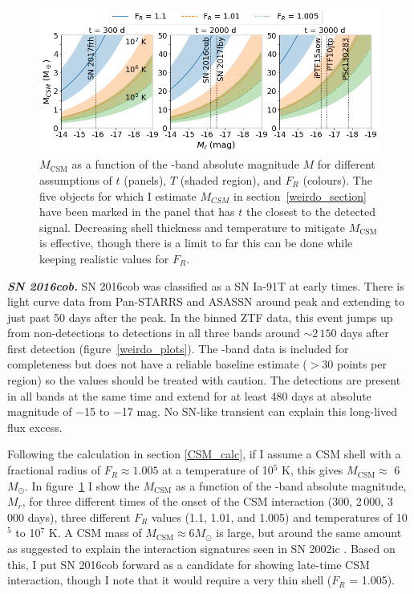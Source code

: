 \documentclass[a4paper,oneside,12pt, class=Latex/Classes/PhDthesisPSnPDF, crop=false]{standalone}
\begin{document}
\begin{figure}
    \centering
    \includegraphics[width=16cm]{../Images/chapter_4/M_MCSM_rel.png}
    \caption[$M_\text{CSM}$ curves for different conditions.]{$M_\text{CSM}$ as a function of the \ztfr-band absolute magnitude $M$ for different assumptions of $t$ (panels), $T$ (shaded region), and $F_R$ (colours). The five objects for which I estimate $M_{CSM}$ in section~\ref{weirdo_section} have been marked in the panel that has $t$ the closest to the detected signal. Decreasing shell thickness and temperature to mitigate $M_\text{CSM}$ is effective, though there is a limit to far this can be done while keeping realistic values for $F_R$.}
    \label{M_CMS_fig}
\end{figure}


\textit{\textbf{SN 2016cob.}}
SN 2016cob was classified as a SN Ia-91T at early times. There is light curve data from Pan-STARRS and ASASSN around peak and extending to just past 50 days after the peak. In the binned ZTF data, this event jumps up from non-detections to detections in all three bands around $\sim2\,150$ days after first detection (figure~\ref{weirdo_plots}). The \ztfi-band data is included for completeness but does not have a reliable baseline estimate ($>$30 points per region) so the values should be treated with caution. The detections are present in all bands at the same time and extend for at least 480 days at absolute magnitude of $-$15 to $-$17 mag. No SN-like transient can explain this long-lived flux excess.

Following the calculation in section \ref{CSM_calc}, if I assume a CSM shell with a fractional radius of $F_R\approx 1.005$ at a temperature of 10$^5$ K, this gives $M_\text{CSM}\approx$ 6 $M_\odot$. In figure~\ref{M_CMS_fig} I show the $M_\text{CSM}$ as a function of the \ztfr-band absolute magnitude, $M_r$, for three different times of the onset of the CSM interaction (300, 2\,000, 3\,000 days), three different $F_R$ values (1.1, 1.01, and 1.005) and temperatures of 10$^5$ to 10$^7$ K. A CSM mass of $M_\text{CSM}\approx6M_\odot$ is large, but around the same amount as suggested to explain the interaction signatures seen in SN 2002ic \citep{Hamuy_02ic}. Based on this, I put SN 2016cob forward as a candidate for showing late-time CSM interaction, though I note that it would require a very thin shell ($F_R$ = 1.005).
\end{document}
